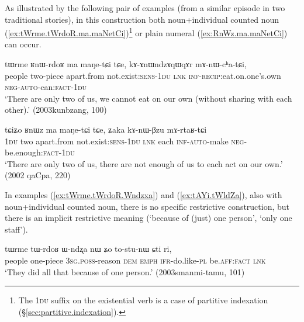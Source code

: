 As illustrated by the following pair of examples (from a similar episode in two traditional stories), in this construction both noun+individual counted noun  (\ref{ex:tWrme.tWrdoR.ma.maNetCi})\footnote{The \textsc{1du} suffix on the existential verb  is a case of partitive indexation (§\ref{sec:partitive.indexation}). }  or plain numeral (\ref{ex:RnWz.ma.maNetCi}) can occur.

\begin{exe}
	\ex \label{ex:tWrme.tWrdoR.ma.maNetCi}
	\gll tɯrme ʁnɯ-rdoʁ ma maŋe-tɕi tɕe, kɤ-ɤnɯndzɤqɯqɤr mɤ-nɯ-cʰa-tɕi, \\
	people two-piece apart.from not.exist:\textsc{sens}-\textsc{1du} \textsc{lnk} \textsc{inf}-\textsc{recip}:eat.on.one's.own \textsc{neg}-\textsc{auto}-can:\textsc{fact}-\textsc{1du} \\
	\glt `There are only two of us, we cannot eat on our own (without sharing with each other).' (2003kunbzang, 100)
\end{exe} 

\begin{exe}
	\ex \label{ex:RnWz.ma.maNetCi}
	\gll  tɕiʑo ʁnɯz ma maŋe-tɕi tɕe, ʑaka kɤ-nɯ-βzu mɤ-rtaʁ-tɕi \\
	\textsc{1du} two apart.from not.exist:\textsc{sens}-\textsc{1du} \textsc{lnk} each \textsc{inf}-\textsc{auto}-make \textsc{neg}-be.enough:\textsc{fact}-\textsc{1du} \\
	\glt  `There are only two of us, there are not enough of us to each act on our own.' (2002 qaCpa, 220)
\end{exe} 

In examples (\ref{ex:tWrme.tWrdoR.Wndzxa}) and (\ref{ex:tAYi.tWldZa}), also with noun+individual counted noun, there is no specific restrictive construction, but there is an implicit restrictive meaning (`because of (just) one person', `only one staff'). 

\begin{exe}
	\ex \label{ex:tWrme.tWrdoR.Wndzxa}
	\gll tɯrme tɯ-rdoʁ ɯ-ndʐa nɯ ʑo to-stu-nɯ ɕti ri, \\
	people one-piece  \textsc{3sg}.\textsc{poss}-reason \textsc{dem} \textsc{emph} \textsc{ifr}-do.like-\textsc{pl} be.\textsc{aff}:\textsc{fact} \textsc{lnk} \\
	\glt `They did all that because of one person.' (2003smanmi-tamu, 101)
\end{exe} 

